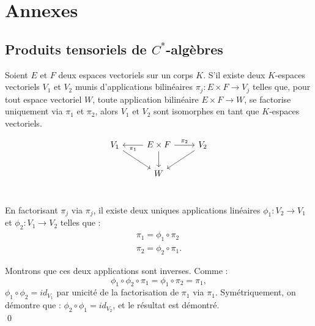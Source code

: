 \section{Annexes}
\subsection{Produits tensoriels de $C^*$-algèbres}

\begin{lem}
Soient $E$ et $F$ deux espaces vectoriels sur un corps $K$. S'il existe deux $K$-espaces vectoriels $V_1$ et $V_2$ munis d'applications bilinéaires $\pi_j : E\times F \rightarrow V_j$ telles que, pour tout espace vectoriel $W$, toute application bilinéaire $E\times F \rightarrow W$,  se factorise uniquement via $\pi_1$ et $\pi_2$, alors $V_1$ et $V_2$ sont isomorphes en tant que $K$-espaces vectoriels.
\end{lem}


\[\begin{tikzcd}
V_1 \arrow{dr}& \arrow{l}{\pi_1}	E\times F \arrow{d}\arrow{r}{\pi_2}	& \arrow{dl}V_2 \\
			 & 		W		&	\\
\end{tikzcd}\]

\begin{dem}
En factorisant $\pi_j$ via $\pi_j$, il existe deux uniques applications linéaires $\phi_1 : V_2\rightarrow V_1$ et $\phi_2 : V_1\rightarrow V_2$ telles que :
\[\begin{array}{c}\pi_1=\phi_1\circ \pi_2 \\ \pi_2=\phi_2\circ \pi_1.\end{array}\]

Montrons que ces deux applications sont inverses. Comme :
\[\phi_1\circ \phi_2 \circ \pi_1 = \phi_1\circ \pi_2 =\pi_1 ,\]
$\phi_1\circ \phi_2 = id_{V_1}$ par unicité de la factorisation de $\pi_1$ via $\pi_1$.
Symétriquement, on démontre que : $\phi_2\circ \phi_1 = id_{V_2}$, et le résultat est démontré.\\
\qed
\end{dem}

